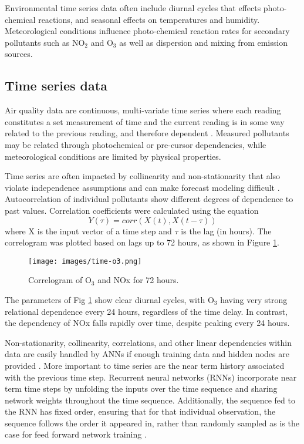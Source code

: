 \documentclass[preprint,12pt,authoryear]{elsarticle}
\begin{document}
\begin{linenumbers}
Environmental time series data often include diurnal cycles that effects photo-chemical reactions, and seasonal effects on temperatures and humidity. Meteorological conditions influence photo-chemical reaction rates for secondary pollutants such as NO$_{2}$ and O$_{3}$ as well as dispersion and mixing from emission sources.

\subsection{Time series data}
Air quality data are continuous, multi-variate time series where each reading constitutes a set measurement of time and the current reading is in some way related to the previous reading, and therefore dependent \citep{Gheyas2011}. Measured pollutants may be related through photochemical or pre-cursor dependencies, while meteorological conditions are limited by physical properties. 

Time series are often impacted by collinearity and non-stationarity that also violate independence assumptions and can make forecast modeling difficult \citep{Gheyas2011}. Autocorrelation of individual pollutants show different degrees of dependence to past values.  Correlation coefficients were calculated using the equation
%
\begin{equation}
\label{eq:corr}
Y(\tau)= corr(X(t),X(t - \tau))
\end{equation}
%
\noindent
where X is the input vector of a time step and $\tau$ is the lag (in hours). The correlogram was plotted based on lags up to 72 hours, as shown in Figure \ref{fig:serialcorr}.
%
\begin{figure}[H]
\centering
\texttt{[image: images/time-o3.png]}  %
\caption{Correlogram of O$_{3}$ and NOx for 72 hours.}
\label{fig:serialcorr}
\end{figure}
%
The parameters of Fig \ref{fig:serialcorr} show clear diurnal cycles, with O$_{3}$ having very strong relational dependence every 24 hours, regardless of the time delay. In contrast, the dependency of NOx falls rapidly over time, despite peaking every 24 hours. 

Non-stationarity, collinearity, correlations, and other linear dependencies within data are easily handled by ANNs if enough training data and hidden nodes are provided \citep{Goodfellow2016}. More important to time series are the near term history associated with the previous time step. Recurrent neural networks (RNNs) incorporate near term time steps by unfolding the inputs over the time sequence and sharing network weights throughout the time sequence. Additionally, the sequence fed to the RNN has fixed order, ensuring that for that individual observation, the sequence follows the order it appeared in, rather than randomly sampled as is the case for feed forward network training \citep{Elangasinghe2014}.


\end{linenumbers}
\end{document}
